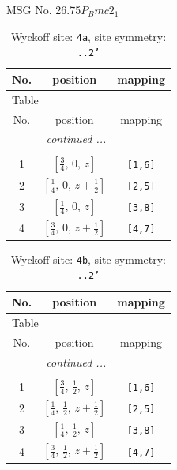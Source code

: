 \documentclass[fleqn,8pt]{jsarticle}
\begin{document}
\setcounter{MaxMatrixCols}{32}

\renewcommand{\tablename}{Table~}
\renewcommand{\figurename}{Figure~}
\begin{center}
\LARGE
MSG No. 26.75\quad$P_{B}mc2_{1}$
\end{center}
\renewcommand{\arraystretch}{1.2}
\begin{longtable}{ccc}
\caption{Wyckoff site: {\tt 4a}, site symmetry: {\tt ..2'}}
 \\
 \hline \hline
No. & position & mapping \\ \hline \endfirsthead

\multicolumn{2}{l}{\tablename\ \thetable{}} \\
 \hline \hline
No. & position & mapping \\ \hline \endhead

 \hline \hline
\multicolumn{2}{r}{\footnotesize\it continued ...} \\ \endfoot

 \hline \hline
\multicolumn{2}{r}{} \\ \endlastfoot

1 & $\left[ \frac{3}{4},\, 0,\, z \right]$ & {\tt [1,6]} \\ \hline
2 & $\left[ \frac{1}{4},\, 0,\, z + \frac{1}{2} \right]$ & {\tt [2,5]} \\ \hline
3 & $\left[ \frac{1}{4},\, 0,\, z \right]$ & {\tt [3,8]} \\ \hline
4 & $\left[ \frac{3}{4},\, 0,\, z + \frac{1}{2} \right]$ & {\tt [4,7]} \\
\end{longtable}
\renewcommand{\arraystretch}{1.2}
\begin{longtable}{ccc}
\caption{Wyckoff site: {\tt 4b}, site symmetry: {\tt ..2'}}
 \\
 \hline \hline
No. & position & mapping \\ \hline \endfirsthead

\multicolumn{2}{l}{\tablename\ \thetable{}} \\
 \hline \hline
No. & position & mapping \\ \hline \endhead

 \hline \hline
\multicolumn{2}{r}{\footnotesize\it continued ...} \\ \endfoot

 \hline \hline
\multicolumn{2}{r}{} \\ \endlastfoot

1 & $\left[ \frac{3}{4},\, \frac{1}{2},\, z \right]$ & {\tt [1,6]} \\ \hline
2 & $\left[ \frac{1}{4},\, \frac{1}{2},\, z + \frac{1}{2} \right]$ & {\tt [2,5]} \\ \hline
3 & $\left[ \frac{1}{4},\, \frac{1}{2},\, z \right]$ & {\tt [3,8]} \\ \hline
4 & $\left[ \frac{3}{4},\, \frac{1}{2},\, z + \frac{1}{2} \right]$ & {\tt [4,7]} \\
\end{longtable}
\end{document}
